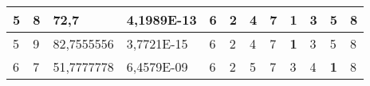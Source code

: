 \documentclass[conference]{IEEEtran}
\begin{document}
\begin{table*}[]
\begin{tabular}{|llll|llllllll|}
\multicolumn{1}{|l|}{5}                                                     & \multicolumn{1}{l|}{8}                                                        & \multicolumn{1}{l|}{72,7}                                                         & 4,1989E-13                     & \multicolumn{1}{l|}{6}                                                  & \multicolumn{1}{l|}{2}                                                  & \multicolumn{1}{l|}{4}                                                  & \multicolumn{1}{l|}{7}                                                  & \multicolumn{1}{l|}{\textbf{1}}                                         & \multicolumn{1}{l|}{3}                                                  & \multicolumn{1}{l|}{5}                                                  & 8                          \\ \hline
\multicolumn{1}{|l|}{5}                                                     & \multicolumn{1}{l|}{9}                                                        & \multicolumn{1}{l|}{82,7555556}                                                   & 3,7721E-15                     & \multicolumn{1}{l|}{6}                                                  & \multicolumn{1}{l|}{2}                                                  & \multicolumn{1}{l|}{4}                                                  & \multicolumn{1}{l|}{7}                                                  & \multicolumn{1}{l|}{\textbf{1}}                                         & \multicolumn{1}{l|}{3}                                                  & \multicolumn{1}{l|}{5}                                                  & 8                          \\ \hline
\multicolumn{1}{|l|}{6}                                                     & \multicolumn{1}{l|}{7}                                                        & \multicolumn{1}{l|}{51,7777778}                                                   & 6,4579E-09                     & \multicolumn{1}{l|}{6}                                                  & \multicolumn{1}{l|}{2}                                                  & \multicolumn{1}{l|}{5}                                                  & \multicolumn{1}{l|}{7}                                                  & \multicolumn{1}{l|}{3}                                                  & \multicolumn{1}{l|}{4}                                                  & \multicolumn{1}{l|}{\textbf{1}}                                         & 8                          \\ \hline

\end{tabular}
\end{table*}
\end{document}

